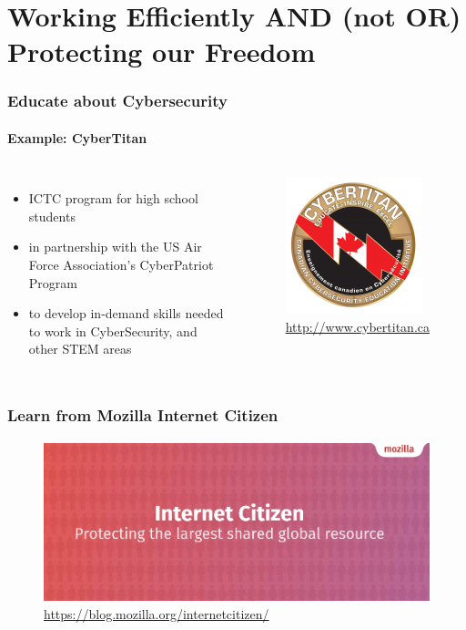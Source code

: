 \documentclass{beamer}
\begin{document}
\section[Section]{Working Efficiently AND (not OR) Protecting our Freedom}
	\begin{frame}
	\frametitle{Educate about Cybersecurity}
	\framesubtitle{Example: CyberTitan}
	\begin{columns}
			\begin{itemize}[<+->]
				\item ICTC program for high school students
				\item in partnership with the US Air Force Association’s CyberPatriot Program
				\item to develop in-demand skills needed to work in CyberSecurity, and other STEM areas
			\end{itemize}
	        	\begin{figure}[h]
                	\centering
                	\includegraphics[width=.6\textwidth]{./images/CP_Cybertitan1-150x150}
			\caption{\url{http://www.cybertitan.ca}}
        		\end{figure}
	\end{columns}
	\end{frame}

	\begin{frame}
	\frametitle{Learn from Mozilla Internet Citizen}
	\framesubtitle{}
	        \begin{figure}[h]
                \centering
                \includegraphics[width=.8\textwidth]{./images/moz-Internet-citizen}
		\caption{\url{https://blog.mozilla.org/internetcitizen/}}
        	\end{figure}
	\end{frame}
\end{document}

